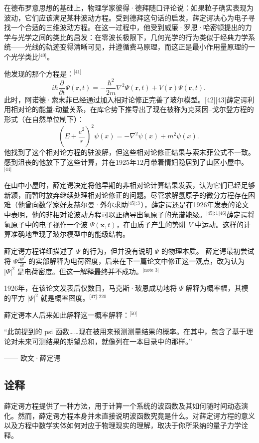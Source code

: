 在德布罗意思想的基础上，物理学家彼得·德拜随口评论说：如果粒子确实表现为波动，它们应该满足某种波动方程。受到德拜这句话的启发，薛定谔决心为电子寻找一个合适的三维波动方程。在这一过程中，他受到威廉·罗恩·哈密顿提出的力学与光学之间的类比的启发：在零波长极限下，几何光学的行为类似于经典力学系统——光线的轨迹变得清晰可见，并遵循费马原理，而这正是最小作用量原理的一个光学类比\(^\text{[40]}\)。

他发现的那个方程是：\(^\text{[41]}\)
$$
i\hbar \frac{\partial}{\partial t} \Psi(\mathbf{r}, t) = -\frac{\hbar^2}{2m} \nabla^2 \Psi(\mathbf{r}, t) + V(\mathbf{r}) \Psi(\mathbf{r}, t).~
$$
此时，阿诺德·索末菲已经通过加入相对论修正完善了玻尔模型。[42][43]薛定谔利用相对论的能量-动量关系，在库仑势下推导出了现在被称为克莱因–戈尔登方程的形式（在自然单位制下）：
$$
\left(E + \frac{e^2}{r}\right)^2 \psi(x) = -\nabla^2 \psi(x) + m^2 \psi(x).~
$$
他找到了这个相对论方程的驻波解，但这些相对论修正结果与索末菲公式不一致。感到沮丧的他放下了这些计算，并在1925年12月带着情妇隐居到了山区小屋中。\(^\text{[44]}\)

在山中小屋时，薛定谔决定将他早期的非相对论计算结果发表，认为它们已经足够新颖，而暂时放弃继续处理相对论修正的问题。尽管求解氢原子的微分方程存在困难（他曾向数学家好友赫尔曼·外尔求助\(^\text{[45]: 3}\) ），薛定谔还是在1926年发表的论文中表明，他的非相对论波动方程可以正确导出氢原子的光谱能级。\(^\text{[45]: 1 [46]}\)薛定谔将氢原子中的电子视作一个波 $\Psi(\mathbf{x}, t)$，在由质子产生的势阱 $V$ 中运动。这样的计算准确地重现了玻尔模型中的能级结构。

薛定谔方程详细描述了 $\Psi$ 的行为，但并没有说明 $\Psi$ 的物理本质。
薛定谔最初尝试将 $\Psi \frac{\partial \Psi^*}{\partial t}$ 的实部解释为电荷密度，后来在下一篇论文中修正这一观点，改为认为 $|\Psi|^2$ 是电荷密度。但这一解释最终并不成功。\(^\text{[note 3]}\)

1926年，在该论文发表后仅数日，马克斯·玻恩成功地将 $\Psi$ 解释为概率幅，其模的平方 $|\Psi|^2$ 就是概率密度。\(^\text{[47]: 220}\) 

薛定谔本人后来如此解释这一概率解释：\(^\text{[50]}\)

“此前提到的 psi 函数……现在被用来预测测量结果的概率。在其中，包含了基于理论对未来可测结果的期望总和，就像列在一本目录中的那样。”

—— 欧文·薛定谔
\subsection{诠释}
薛定谔方程提供了一种方法，用于计算一个系统的波函数及其如何随时间动态演化。然而，薛定谔方程本身并未直接说明波函数究竟是什么。对薛定谔方程的意义以及方程中数学实体如何对应于物理现实的理解，取决于你所采纳的量子力学诠释。

